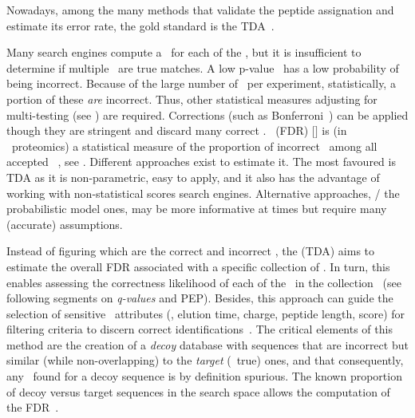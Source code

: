
Nowadays, among the many methods that validate the peptide assignation and
estimate its error rate,
the gold standard is the \gls{TDA}~.

Many search engines compute a \pval\ for each of the \psms,
but it is insufficient to determine if multiple \psms\ are true matches.
A low p-value \psm\ has a low probability of being incorrect.
Because of the large number of \psms\ per experiment,
statistically, a portion of these \emph{are} incorrect.
Thus, other statistical measures
adjusting for multi-testing (see )
are required.
Corrections (such as Bonferroni~) can be applied
though they are stringent and discard many correct \psms.
~(\gls{FDR}) $[$\citet*{Benjamini1995-nf}$]$ is
(in \ms\ proteomics)
a statistical measure of the proportion of incorrect \psms\
among all accepted \psms~,
see \Cref{eq:fdr-prot}.
Different approaches exist to estimate it.
The most favoured is \gls{TDA}
as it is non-parametric, easy to apply, and
it also has the advantage of working with non-statistical scores search engines.
Alternative approaches, \ie/ the probabilistic model ones,
may be more informative at times but require many (accurate) assumptions.

Instead of figuring which are the correct and incorrect \psms,
the  (\gls{TDA}) aims to estimate
the overall \gls{FDR} associated with a specific collection of \psms.
In turn, this enables assessing the correctness likelihood of each of the \psms\
in the collection~
(see following segments on \emph{q-values} and \gls{PEP}).
Besides, this approach can guide
the selection of sensitive \psm\ attributes
(\eg, elution time, charge, peptide length, score)
for filtering criteria to discern correct identifications~.
The critical elements of this method are
the creation of a \emph{decoy} database with sequences
that are incorrect but similar (while non-overlapping)
to the \emph{target} (\ie\ true) ones,
and that consequently, any \psm\ found for a decoy sequence is by definition spurious.
The known proportion of decoy versus target sequences in the search space allows
the computation of the \gls{FDR}~\mycite{Elias2007-wi,Elias2010-kp}.
\vspace{-9mm}

